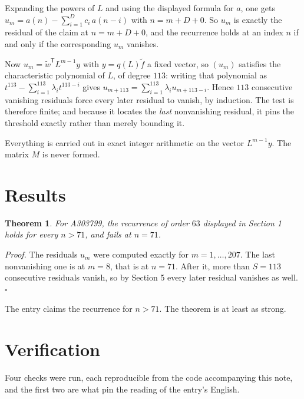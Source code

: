 \documentclass[11pt]{article}
\newtheorem{theorem}{Theorem}
\theoremstyle{definition}
\begin{document}
Expanding the powers of $L$ and using the displayed formula for $a$, one gets $u_m = a(n) - \sum_{i=1}^{D} c_i\,a(n-i)$ with $n = m + D + 0$. So $u_m$ is exactly the residual of the claim at $n = m + D + 0$, and the recurrence holds at an index $n$ if and only if the corresponding $u_m$ vanishes.

Now $u_m = \tilde w^{\mathsf T} L^{m-1} y$ with $y = q(L)\tilde f$ a fixed vector, so $(u_m)$ satisfies the characteristic polynomial of $L$, of degree $113$: writing that polynomial as $t^{113} - \sum_{i=1}^{113} \lambda_i t^{113-i}$ gives $u_{m+113} = \sum_{i=1}^{113} \lambda_i u_{m+113-i}$. Hence $113$ consecutive vanishing residuals force every later residual to vanish, by induction. The test is therefore finite; and because it locates the {\itshape last} nonvanishing residual, it pins the threshold exactly rather than merely bounding it.

Everything is carried out in exact integer arithmetic on the vector $L^{m-1}y$. The matrix $M$ is never formed.

\section{Results}

\begin{theorem} For A303799, the recurrence of order $63$ displayed in Section 1 holds for every $n > 71$, and fails at $n = 71$.\end{theorem}

{\itshape Proof.} The residuals $u_m$ were computed exactly for $m = 1,\dots,207$. The last nonvanishing one is at $m = 8$, that is at $n = 71$. After it, more than $S = 113$ consecutive residuals vanish, so by Section 5 every later residual vanishes as well. $\square$

The entry claims the recurrence for $n > 71$. The theorem is at least as strong.

\section{Verification}

Four checks were run, each reproducible from the code accompanying this note, and the first two are what pin the reading of the entry's English.
\end{document}
